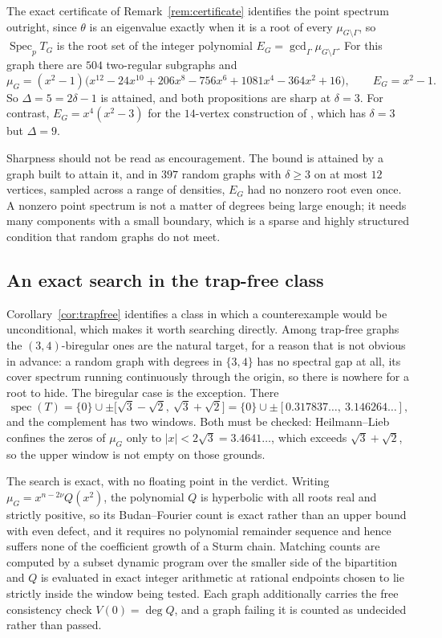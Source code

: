 \documentclass[11pt]{article}
\theoremstyle{remark}
\begin{document}
The exact certificate of Remark~\ref{rem:certificate} identifies the point spectrum outright, since
$\theta$ is an eigenvalue exactly when it is a root of every $\mu_{G\setminus\Gamma}$, so
$\operatorname{Spec}_pT_G$ is the root set of the integer polynomial
$E_G=\gcd_\Gamma\mu_{G\setminus\Gamma}$. For this graph there are $504$ two-regular subgraphs and
\[
  \mu_G=(x^2-1)\bigl(x^{12}-24x^{10}+206x^{8}-756x^{6}+1081x^{4}-364x^{2}+16\bigr),
  \qquad E_G=x^2-1 .
\]
So $\Delta=5=2\delta-1$ is attained, and both propositions are sharp at $\delta=3$. For contrast,
$E_G=x^4(x^2-3)$ for the $14$-vertex construction of \cite{Supp}, which has $\delta=3$ but
$\Delta=9$.

Sharpness should not be read as encouragement. The bound is attained by a graph built to attain it,
and in $397$ random graphs with $\delta\ge3$ on at most $12$ vertices, sampled across a range of
densities, $E_G$ had no nonzero root even once. A nonzero point spectrum is not a matter of degrees
being large enough; it needs many components with a small boundary, which is a sparse and highly
structured condition that random graphs do not meet.

\subsection{An exact search in the trap-free class}\label{sec:biregular}

Corollary~\ref{cor:trapfree} identifies a class in which a counterexample would be unconditional,
which makes it worth searching directly. Among trap-free graphs the $(3,4)$-biregular ones are the
natural target, for a reason that is not obvious in advance: a random graph with degrees in
$\{3,4\}$ has no spectral gap at all, its cover spectrum running continuously through the origin,
so there is nowhere for a root to hide. The biregular case is the exception. There
\[
  \operatorname{spec}(T)=\{0\}\cup\pm\bigl[\sqrt3-\sqrt2,\ \sqrt3+\sqrt2\bigr]
  =\{0\}\cup\pm[0.317837\ldots,\ 3.146264\ldots],
\]
and the complement has two windows. Both must be checked: Heilmann--Lieb confines the zeros of
$\mu_G$ only to $|x|<2\sqrt3=3.4641\ldots$, which exceeds $\sqrt3+\sqrt2$, so the upper window is
not empty on those grounds.

The search is exact, with no floating point in the verdict. Writing $\mu_G=x^{n-2\nu}Q(x^2)$, the
polynomial $Q$ is hyperbolic with all roots real and strictly positive, so its Budan--Fourier count
is exact rather than an upper bound with even defect, and it requires no polynomial remainder
sequence and hence suffers none of the coefficient growth of a Sturm chain. Matching counts are
computed by a subset dynamic program over the smaller side of the bipartition and $Q$ is evaluated
in exact integer arithmetic at rational endpoints chosen to lie strictly inside the window being
tested. Each graph additionally carries the free consistency check $V(0)=\deg Q$, and a graph
failing it is counted as undecided rather than passed.
\end{document}
